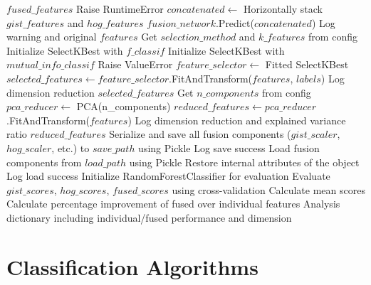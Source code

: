\begin{algorithm}[!htbp]
\begin{algorithmic}[1]
    \Return $fused\_features$
\EndProcedure
\Statex
{}
     \State Raise RuntimeError \EndIf
    \State $concatenated \leftarrow$ Horizontally stack $gist\_features$ and $hog\_features$
    \Return $fusion\_network$.Predict($concatenated$)
\EndProcedure
\Statex
{}
     Log warning and \Return original $features$ \EndIf
    \State Get $selection\_method$ and $k\_features$ from config
     Initialize SelectKBest with $f\_classif$
     Initialize SelectKBest with $mutual\_info\_classif$
    \Else \State Raise ValueError
    \EndIf
    \State $feature\_selector \leftarrow$ Fitted SelectKBest
    \State $selected\_features \leftarrow feature\_selector$.FitAndTransform($features$, $labels$)
    \State Log dimension reduction
    \Return $selected\_features$
\EndProcedure
\Statex
{}
    \State Get $n\_components$ from config
    \State $pca\_reducer \leftarrow$ PCA(n\_components)
    \State $reduced\_features \leftarrow pca\_reducer$.FitAndTransform($features$)
    \State Log dimension reduction and explained variance ratio
    \Return $reduced\_features$
\EndProcedure
\Statex
{}
    \State Serialize and save all fusion components ($gist\_scaler$, $hog\_scaler$, etc.) to $save\_path$ using Pickle
    \State Log save success
\EndProcedure
\Statex
{}
    \State Load fusion components from $load\_path$ using Pickle
    \State Restore internal attributes of the object
    \State Log load success
\EndProcedure
\Statex
{}
    \State Initialize RandomForestClassifier for evaluation
    \State Evaluate $gist\_scores$, $hog\_scores$, $fused\_scores$ using cross-validation
    \State Calculate mean scores
    \State Calculate percentage improvement of fused over individual features
\Return Analysis dictionary including individual/fused performance and dimension
\EndProcedure
\end{algorithmic}
\end{algorithm}

\section{Classification Algorithms}
\label{sec:classification-algorithms}

